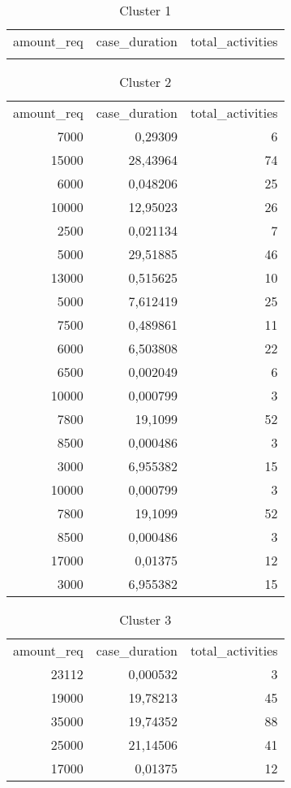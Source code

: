 \begin{table}[ht]
  \centering
  \caption{Cluster 1}
    \begin{tabular}{rrr}
    \multicolumn{1}{l}{amount\_req} & \multicolumn{1}{l}{case\_duration} & \multicolumn{1}{l}{total\_activities} \\
          &       &  \\
    \end{tabular}%
  \label{tab:clust1}%
\end{table}%
\begin{table}[htbp]
  \centering
  \caption{Cluster 2}
       \begin{tabular}{rrr}
    \multicolumn{1}{l}{amount\_req} & \multicolumn{1}{l}{case\_duration} & \multicolumn{1}{l}{total\_activities} \\
    7000  & 0,29309 & 6 \\
    15000 & 28,43964 & 74 \\
    6000  & 0,048206 & 25 \\
    10000 & 12,95023 & 26 \\
    2500  & 0,021134 & 7 \\
    5000  & 29,51885 & 46 \\
    13000 & 0,515625 & 10 \\
    5000  & 7,612419 & 25 \\
    7500  & 0,489861 & 11 \\
    6000  & 6,503808 & 22 \\
    6500  & 0,002049 & 6 \\
    10000 & 0,000799 & 3 \\
    7800  & 19,1099 & 52 \\
    8500  & 0,000486 & 3 \\
    3000  & 6,955382 & 15 \\
    10000 & 0,000799 & 3 \\
    7800  & 19,1099 & 52 \\
    8500  & 0,000486 & 3 \\
    17000 & 0,01375 & 12 \\
    3000  & 6,955382 & 15 \\
    \end{tabular}%
  \label{tab:clust2}%
\end{table}%
\begin{table}[htbp]
  \centering
  \caption{Cluster 3}
    \begin{tabular}{rrr}
    \multicolumn{1}{l}{amount\_req} & \multicolumn{1}{l}{case\_duration} & \multicolumn{1}{l}{total\_activities} \\
    23112 & 0,000532 & 3 \\
    19000 & 19,78213 & 45 \\
    35000 & 19,74352 & 88 \\
    25000 & 21,14506 & 41 \\
    17000 & 0,01375 & 12 \\
    \end{tabular}%
  \label{tab:clust3}%
\end{table}%
